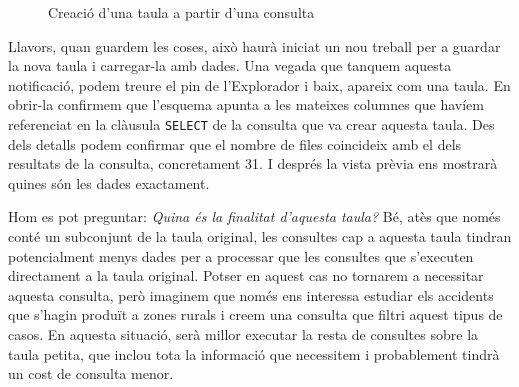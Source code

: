 \documentclass[11pt,longbibliography]{article}
\theoremstyle{definition}
\theoremstyle{remark}
\begin{document}
\begin{figure}[h!]
\par
{}%
\hfill
{}%
\par

\caption{Creació d'una taula a partir d'una consulta}
\label{fig:bq17}
\end{figure}



Llavors, quan guardem les coses, això haurà iniciat un nou treball per a guardar la nova taula i carregar-la amb dades. Una vegada que tanquem aquesta notificació, podem treure el pin de l'Explorador i baix, apareix com una taula. En obrir-la confirmem que l'esquema apunta a les mateixes columnes que havíem referenciat en la clàusula \verb|SELECT| de la consulta que va crear aquesta taula. Des dels detalls podem confirmar que el nombre de files coincideix amb el dels resultats de la consulta, concretament 31. I després la vista prèvia ens mostrarà quines són les dades exactament. 



Hom es pot preguntar: \textit{Quina és la finalitat d'aquesta taula?} Bé, atès que només conté un subconjunt de la taula original, les consultes cap a aquesta taula tindran potencialment menys dades per a processar que les consultes que s'executen directament a la taula original. Potser en aquest cas no tornarem a necessitar aquesta consulta, però imaginem que només ens interessa estudiar els accidents que s'hagin produït a zones rurals i creem una consulta que filtri aquest tipus de casos. En aquesta situació, serà millor executar la resta de consultes sobre la taula petita, que inclou tota la informació que necessitem i probablement tindrà un cost de consulta menor.
\end{document}
